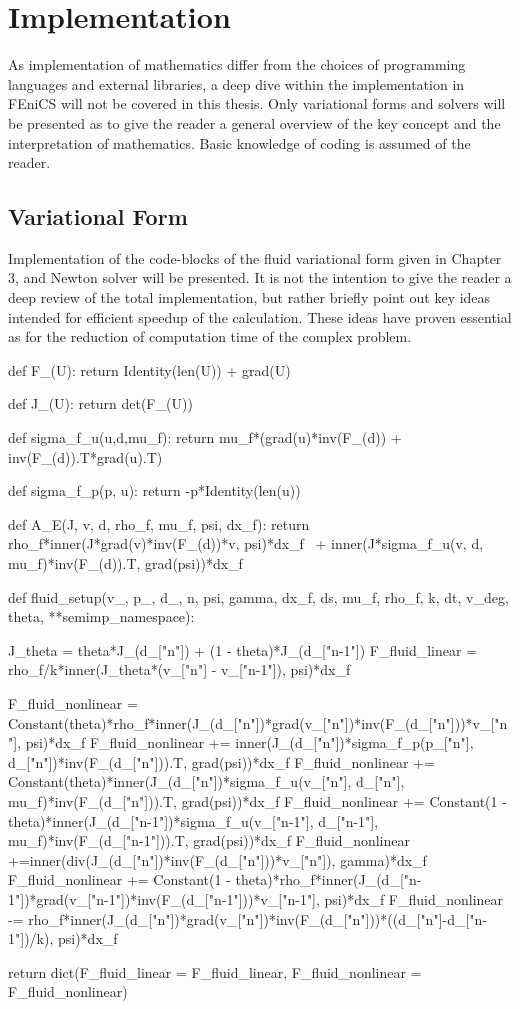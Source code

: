\section{Implementation}
As implementation of mathematics differ from the choices of programming languages and external libraries, a deep dive within the implementation in FEniCS will not be covered in this thesis. Only variational forms and solvers will be presented as to give the reader a general overview of the key concept and the interpretation of mathematics. Basic knowledge of coding is assumed of the reader. 

\subsection{Variational Form}
Implementation of the code-blocks of the fluid variational form given in Chapter 3, and Newton solver will be presented. It is not the intention to give the reader a deep review of the total implementation, but rather briefly point out key ideas intended for efficient speedup of the calculation. These ideas have proven essential as for the reduction of computation time of the complex problem.

\begin{python}[caption=thetaCN.py]
def F_(U):
	return Identity(len(U)) + grad(U)

def J_(U):
	return det(F_(U))

def sigma_f_u(u,d,mu_f):
    return  mu_f*(grad(u)*inv(F_(d)) + inv(F_(d)).T*grad(u).T)

def sigma_f_p(p, u):
    return -p*Identity(len(u))

def A_E(J, v, d, rho_f, mu_f, psi, dx_f):
    return rho_f*inner(J*grad(v)*inv(F_(d))*v, psi)*dx_f \
        + inner(J*sigma_f_u(v, d, mu_f)*inv(F_(d)).T, grad(psi))*dx_f


def fluid_setup(v_, p_, d_, n, psi, gamma, dx_f, ds, mu_f, rho_f, k, dt, v_deg, theta, **semimp_namespace):

	J_theta = theta*J_(d_["n"]) + (1 - theta)*J_(d_["n-1"])
	F_fluid_linear = rho_f/k*inner(J_theta*(v_["n"] - v_["n-1"]), psi)*dx_f

	F_fluid_nonlinear =  Constant(theta)*rho_f*inner(J_(d_["n"])*grad(v_["n"])*inv(F_(d_["n"]))*v_["n"], psi)*dx_f
	F_fluid_nonlinear += inner(J_(d_["n"])*sigma_f_p(p_["n"], d_["n"])*inv(F_(d_["n"])).T, grad(psi))*dx_f
	F_fluid_nonlinear += Constant(theta)*inner(J_(d_["n"])*sigma_f_u(v_["n"], d_["n"], mu_f)*inv(F_(d_["n"])).T, grad(psi))*dx_f
	F_fluid_nonlinear += Constant(1 - theta)*inner(J_(d_["n-1"])*sigma_f_u(v_["n-1"], d_["n-1"], mu_f)*inv(F_(d_["n-1"])).T, grad(psi))*dx_f
	F_fluid_nonlinear +=inner(div(J_(d_["n"])*inv(F_(d_["n"]))*v_["n"]), gamma)*dx_f
	F_fluid_nonlinear += Constant(1 - theta)*rho_f*inner(J_(d_["n-1"])*grad(v_["n-1"])*inv(F_(d_["n-1"]))*v_["n-1"], psi)*dx_f
	F_fluid_nonlinear -= rho_f*inner(J_(d_["n"])*grad(v_["n"])*inv(F_(d_["n"]))*((d_["n"]-d_["n-1"])/k), psi)*dx_f

	return dict(F_fluid_linear = F_fluid_linear, F_fluid_nonlinear = F_fluid_nonlinear)
\end{python}


